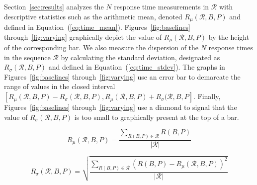 \documentclass{sig-alternate}
\begin{document}


Section~\ref{sec:results} analyzes the $N$ response time measurements
in $\mathcal{R}$ with descriptive statistics such as the arithmetic
mean, denoted $R_\mu (\mathcal{R}, B, P)$ and defined in
Equation~(\ref{eq:time_mean}).  Figures~\ref{fig:baselines}
through~\ref{fig:varying} graphically depict the value of
$R_\mu(\mathcal{R}, B,P)$ by the height of the corresponding bar.  We
also measure the dispersion of the $N$ response times in the sequence
$\mathcal{R}$ by calculating the standard deviation, designated as
$R_\sigma (\mathcal{R}, B, P)$ and defined in
Equation~(\ref{eq:time_stdev}).  The graphs in
Figures~\ref{fig:baselines} through~\ref{fig:varying} use an error bar
to demarcate the range of values in the closed interval
$[R_\mu(\mathcal{R}, B,P)-R_\sigma (\mathcal{R}, B, P),
  R_\mu(\mathcal{R}, B,P)+R_\sigma (\mathcal{R}, B, P]$. Finally,
Figures~\ref{fig:baselines} through~\ref{fig:varying} use a diamond to
signal that the value of $R_\sigma (\mathcal{R}, B, P)$ is too small
to graphically present at the top of a bar.

\vspace*{-.1in}

\begin{equation} \label{eq:time_mean}
R_\mu (\mathcal{R}, B, P) = \frac{\displaystyle \sum_{R(B,P) \in \mathcal{R}} R(B,P)}{|\mathcal{R}|}
\end{equation}

\begin{equation} \label{eq:time_stdev}
R_\sigma (\mathcal{R}, B, P) = 
      \sqrt{\frac{\displaystyle \sum_{R(B,P) \in \mathcal{R}} 
                                (R(B,P) - R_\mu (\mathcal{R}, B, P))^2}
                 {|\mathcal{R}|}}
\end{equation}
\end{document}
